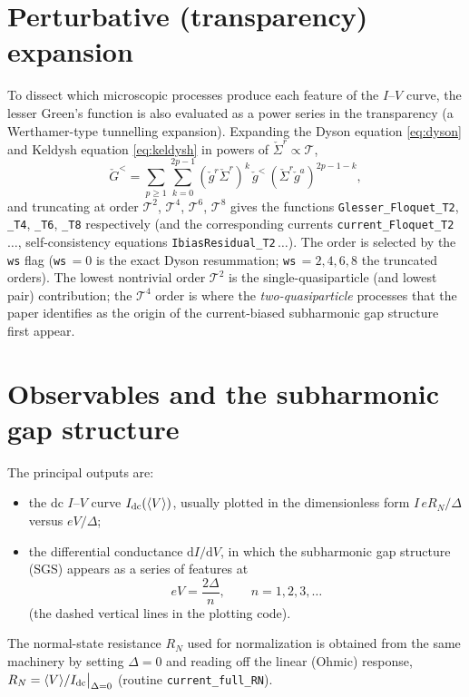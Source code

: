 \documentclass[11pt,a4paper]{article}
\newcommand{\dd}{\mathrm{d}}
\newcommand{\gr}{\check{g}}            %
\newcommand{\Gr}{\check{G}}            %
\newcommand{\Sig}{\check{\Sigma}}      %
\begin{document}
\section{Perturbative (transparency) expansion}
\label{sec:perturbation}

To dissect which microscopic processes produce each feature of the
$I$--$V$ curve, the lesser Green's function is also evaluated as a power series
in the transparency (a Werthamer-type tunnelling expansion).  Expanding the
Dyson equation \eqref{eq:dyson} and Keldysh equation \eqref{eq:keldysh} in
powers of $\Sig^r\propto\mathcal{T}$,
\begin{equation}
  \Gr^< = \sum_{p\ge 1}
  \sum_{k=0}^{2p-1}
  (\gr^r\Sig^r)^{k}\,\gr^<\,(\Sig^r\gr^a)^{2p-1-k},
  \label{eq:pert_expansion}
\end{equation}
and truncating at order $\mathcal{T}^{2}$, $\mathcal{T}^{4}$, $\mathcal{T}^{6}$,
$\mathcal{T}^{8}$ gives the functions \texttt{Glesser\_Floquet\_T2},
\texttt{\_T4}, \texttt{\_T6}, \texttt{\_T8} respectively (and the corresponding
currents \texttt{current\_Floquet\_T2}\,$\ldots$, self-consistency equations
\texttt{IbiasResidual\_T2}\,$\ldots$).  The order is selected by the \texttt{ws} flag
(\texttt{ws}\,$=0$ is the exact Dyson resummation; \texttt{ws}\,$=2,4,6,8$ the
truncated orders).  The lowest nontrivial order $\mathcal{T}^2$ is the
single-quasiparticle (and lowest pair) contribution; the $\mathcal{T}^4$
order is where the \emph{two-quasiparticle} processes that the paper identifies
as the origin of the current-biased subharmonic gap structure first appear.

\section{Observables and the subharmonic gap structure}
\label{sec:observables}

The principal outputs are:
\begin{itemize}
  \item the dc $I$--$V$ curve $I_{\rm dc}(\langle V\rangle)$, usually plotted in
        the dimensionless form $I\,e R_N/\Delta$ versus $eV/\Delta$;
  \item the differential conductance $\dd I/\dd V$, in which the subharmonic gap
        structure (SGS) appears as a series of features at
        \begin{equation}
          eV = \frac{2\Delta}{n},\qquad n=1,2,3,\dots
        \end{equation}
        (the dashed vertical lines in the plotting code).
\end{itemize}
The normal-state resistance $R_N$ used for normalization is obtained from the
same machinery by setting $\Delta=0$ and reading off the linear (Ohmic)
response, $R_N = \langle V\rangle / I_{\rm dc}\big|_{\Delta=0}$ (routine
\texttt{current\_full\_RN}).
\end{document}
